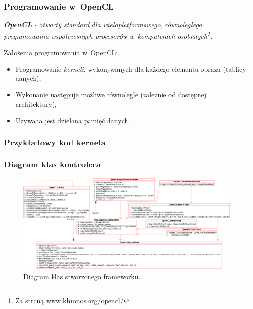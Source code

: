 \documentclass{beamer}
\begin{document}
\begin{frame}
	\frametitle{Programowanie w~OpenCL}
	
	\emph{\textbf{OpenCL} - otwarty standard dla wieloplatformowego, równoległego programowania współczesnych procesorów w~komputerach osobistych\footnote{Za stroną www.khronos.org/opencl/}.}
	
	\vspace{1em}
	
	Założenia programowania w~OpenCL:
	
	\begin{itemize}
	\item Programowanie \emph{kerneli}, wykonywanych dla każdego elementu obrazu (tablicy danych),
	\item Wykonanie następuje możliwe równolegle (zależnie od dostępnej architektury),
	\item Używana jest dzielona pamięć danych.
  \end{itemize}
\end{frame}

\begin{frame}
\frametitle{Przykładowy kod kernela}

\end{frame}


\begin{frame}
  \frametitle{Diagram klas kontrolera}
\begin{figure}
  \centering
  \includegraphics[width=0.9\linewidth]{class_diagram}
  \caption{Diagram klas stworzonego frameworku.}
  \label{fig:class_diagram}
\end{figure}
\end{frame}
\end{document}

